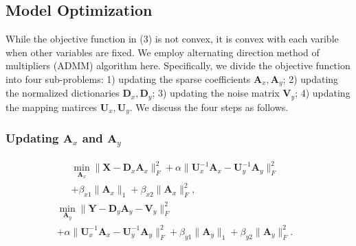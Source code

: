 \documentclass[10pt,twocolumn,letterpaper]{article}
\begin{document}
\subsection{Model Optimization}
While the objective function in (3) is not convex, it is convex with each varible when other variables are fixed. We employ alternating direction method of multipliers (ADMM) algorithm here. Specifically, we divide the objective function into four sub-problems: 1) updating the sparse coefficients $\mathbf{A}_{x}, \mathbf{A}_{y}$; 2) updating the normalized dictionaries $\mathbf{D}_{x}, \mathbf{D}_{y}$; 3) updating the noise matrix $\mathbf{V}_{y}$; 4) updating the mapping matirces $\mathbf{U}_{x}, \mathbf{U}_{y}$. We discuss the four steps as follows.

\subsubsection{Updating $\mathbf{A}_{x}$ and $\mathbf{A}_{y}$}

\begin{equation}
\begin{split}
\min_{\mathbf{A}_{x}}
\|\mathbf{X}-\mathbf{D}_{x}\mathbf{A}_{x}\|_{F}^{2}
+
\alpha
\|\mathbf{U}_{x}^{-1}\mathbf{A}_{x}-\mathbf{U}_{y}^{-1}\mathbf{A}_{y}\|_{F}^{2}
&
\\
+
\beta_{x1}\|\mathbf{A}_{x}\|_{1}
+
\beta_{x2}\|\mathbf{A}_{x}\|_{F}^{2},
\end{split}
\end{equation}
\begin{equation}
\begin{split}
\min_{\mathbf{A}_{y}}
\|\mathbf{Y}-\mathbf{D}_{y}\mathbf{A}_{y}-\mathbf{V}_{y}\|_{F}^{2}
&
\\
+
\alpha
\|\mathbf{U}_{x}^{-1}\mathbf{A}_{x}-\mathbf{U}_{y}^{-1}\mathbf{A}_{y}\|_{F}^{2}
+
\beta_{y1}\|\mathbf{A}_{y}\|_{1}
+
\beta_{y2}\|\mathbf{A}_{y}\|_{F}^{2}.
\end{split}
\end{equation}
\end{document}
